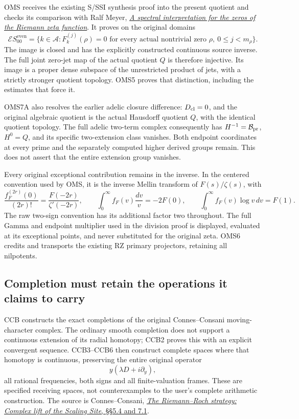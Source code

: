 OMS receives the existing S/SSI synthesis proof into the present
quotient and checks its comparison with Ralf Meyer,
\href{https://arxiv.org/abs/math/0412277v3}{\emph{A spectral
interpretation for the zeros of the Riemann zeta function}}. It proves
on the original domains \[
\mathcal E S_{00}^{\mathrm{even}}
=\{k\in\mathcal A:F_k^{(j)}(\rho)=0
\text{ for every actual nontrivial zero }\rho,\ 0\le j<m_\rho\}.
\] The image is closed and has the explicitly constructed continuous
source inverse. The full joint zero-jet map of the actual quotient \(Q\)
is therefore injective. Its image is a proper dense subspace of the
unrestricted product of jets, with a strictly stronger quotient
topology. OMS5 proves that distinction, including the estimates that
force it.

OMS7A also resolves the earlier adelic closure difference:
\(D_{\rm cl}=0\), and the original algebraic quotient is the actual
Hausdorff quotient \(Q\), with the identical quotient topology. The full
adelic two-term complex consequently has \(H^{-1}=\mathcal B_{\rm pr}\),
\(H^0=Q\), and its specific two-extension class vanishes. Both endpoint
coordinates at every prime and the separately computed higher derived
groups remain. This does not assert that the entire extension group
vanishes.

Every original exceptional contribution remains in the inverse. In the
centered convention used by OMS, it is the inverse Mellin transform of
\(F(s)/\zeta(s)\), with \[
\frac{f_F^{(2r)}(0)}{(2r)!}=\frac{F(-2r)}{\zeta'(-2r)},\qquad
\int_0^\infty f_F(v)\frac{dv}{v}=-2F(0),\qquad
\int_0^\infty f_F(v)\log v\,dv=F(1).
\] The raw two-sign convention has its additional factor two throughout.
The full Gamma and endpoint multiplier used in the division proof is
displayed, evaluated at its exceptional points, and never substituted
for the original zeta. OMS6 credits and transports the existing RZ
primary projectors, retaining all nilpotents.

\subsection{Completion must retain the operations it claims to
carry}\label{completion-must-retain-the-operations-it-claims-to-carry}

CCB constructs the exact completions of the original Connes--Consani
moving-character complex. The ordinary smooth completion does not
support a continuous extension of its radial homotopy; CCB2 proves this
with an explicit convergent sequence. CCB3--CCB6 then construct complete
spaces where that homotopy is continuous, preserving the entire original
operator \[
y(\lambda D+i\partial_y),
\] all rational frequencies, both signs and all finite-valuation frames.
These are specified receiving spaces, not counterexamples to the user's
complete arithmetic construction. The source is Connes--Consani,
\href{https://arxiv.org/abs/1805.10501v1}{\emph{The Riemann--Roch
strategy: Complex lift of the Scaling Site}, §§5.4 and 7.1}.

